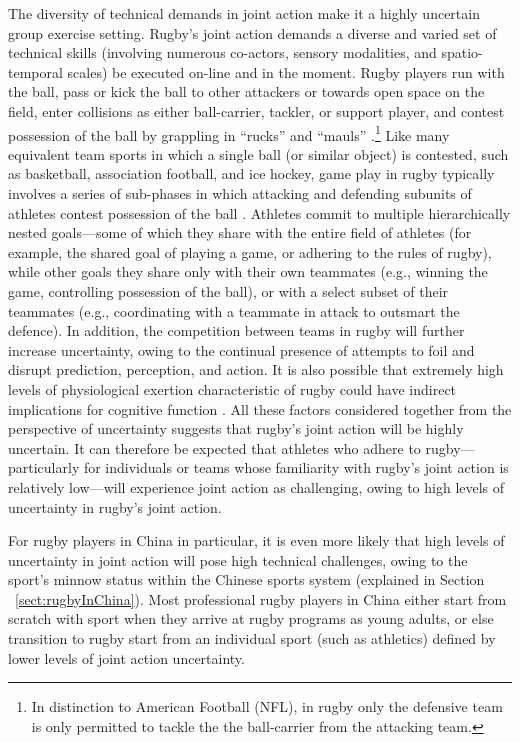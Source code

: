 \begin{CJK}{UTF8}{gbsn}
The diversity of technical demands in joint action make it a highly uncertain group exercise setting.  Rugby's joint action demands a diverse and varied set of technical skills (involving numerous co-actors, sensory modalities, and spatio-temporal scales) be executed on-line and in the moment.  Rugby players run with the ball, pass or kick the ball to other attackers or towards open space on the field, enter collisions as either ball-carrier, tackler, or support player, and contest possession of the ball by grappling in ``rucks'' and ``mauls'' \citep{Ross2015a}.\footnote{In distinction to American Football (NFL), in rugby only the defensive team is only permitted to tackle the the ball-carrier from the attacking team.}  Like many equivalent team sports in which a single ball (or similar object) is contested, such as basketball, association football, and ice hockey, game play in rugby typically involves a series of sub-phases in which attacking and defending subunits of athletes contest possession of the ball \citep{Passos2011}.  Athletes commit to multiple hierarchically nested goals---some of which they share with the entire field of athletes (for example, the shared goal of playing a game, or adhering to the rules of rugby), while other goals they share only with their own teammates (e.g., winning the game, controlling possession of the ball), or with a select subset of their teammates (e.g., coordinating with a teammate in attack to outsmart the defence).  In addition, the competition between teams in rugby will further increase uncertainty, owing to the continual presence of attempts to foil and disrupt prediction, perception, and action. It is also possible that extremely high levels of physiological exertion characteristic of rugby could have indirect implications for cognitive function \citep{Dietrich2004a}.  All these factors considered together from the perspective of uncertainty suggests that rugby's joint action will be highly uncertain.  It can therefore be expected that athletes who adhere to rugby---particularly for individuals or teams whose familiarity with rugby's joint action is relatively low---will experience joint action as challenging, owing to high levels of uncertainty in rugby's joint action.

For rugby players in China in particular, it is even more likely that high levels of uncertainty in joint action will pose high technical challenges, owing to the sport's minnow status within the Chinese sports system (explained in Section ~\ref{sect:rugbyInChina}).  Most professional rugby players in China either start from scratch with sport when they arrive at rugby programs as young adults, or else transition to rugby start from an individual sport (such as athletics) defined by lower levels of joint action uncertainty.



\end{CJK}
